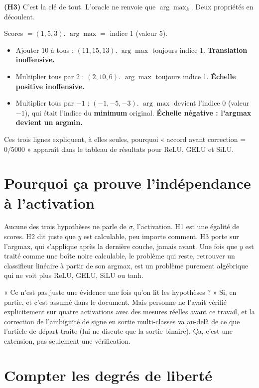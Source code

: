 \documentclass[11pt]{article}
\begin{document}
\textbf{(H3)} C'est la clé de tout. L'oracle ne renvoie que $\arg\max_k$.
Deux propriétés en découlent.

\begin{cle}
Scores $= (1, 5, 3)$. $\arg\max = $ indice 1 (valeur 5).
\begin{itemize}
  \item Ajouter $10$ à tous : $(11, 15, 13)$. $\arg\max$ toujours indice 1.
    \textbf{Translation inoffensive.}
  \item Multiplier tous par $2$ : $(2, 10, 6)$. $\arg\max$ toujours indice 1.
    \textbf{Échelle positive inoffensive.}
  \item Multiplier tous par $-1$ : $(-1, -5, -3)$. $\arg\max$ devient
    l'indice 0 (valeur $-1$), qui était l'indice du \textbf{minimum}
    original. \textbf{Échelle négative : l'argmax devient un argmin.}
\end{itemize}
Ces trois lignes expliquent, à elles seules, pourquoi « accord avant
correction = $0/5000$ » apparaît dans le tableau de résultats pour ReLU,
GELU et SiLU.
\end{cle}

\section{Pourquoi ça prouve l'indépendance à l'activation}

Aucune des trois hypothèses ne parle de $\sigma$, l'activation. H1 est une
égalité de scores. H2 dit juste que $y$ est calculable, peu importe
comment. H3 porte sur l'argmax, qui s'applique après la dernière couche,
jamais avant. Une fois que $y$ est traité comme une boîte noire calculable,
le problème qui reste, retrouver un classifieur linéaire à partir de son
argmax, est un problème purement algébrique qui ne voit plus ReLU, GELU,
SiLU ou tanh.

\begin{question}{« Ce n'est pas juste une évidence une fois qu'on lit les hypothèses ? »}
Si, en partie, et c'est assumé dans le document. Mais personne ne l'avait
vérifié explicitement sur quatre activations avec des mesures réelles avant
ce travail, et la correction de l'ambiguïté de signe en sortie
multi-classes va au-delà de ce que l'article de départ traite (lui ne
discute que la sortie binaire). Ça, c'est une extension, pas seulement une
vérification.
\end{question}

\section{Compter les degrés de liberté}
\end{document}
